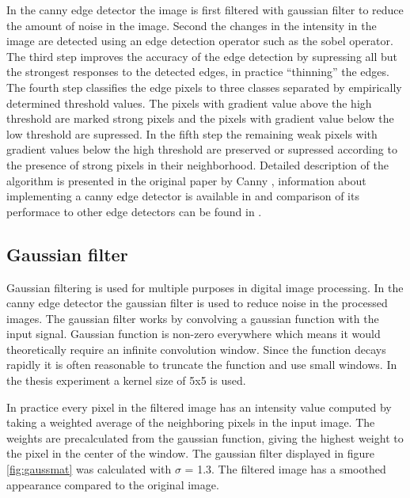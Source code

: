 In the canny edge detector the image is first filtered with gaussian filter to
reduce the amount of noise in the image. Second the changes in the intensity in
the image are detected using an edge detection operator such as the sobel
operator. The third step improves the accuracy of the edge detection by
supressing all but the strongest responses to the detected edges, in practice
``thinning'' the edges. The fourth step classifies the edge pixels to three
classes separated by empirically determined threshold values. The pixels with
gradient value above the high threshold are marked strong pixels and the pixels
with gradient value below the low threshold are supressed. In the fifth step the
remaining weak pixels with gradient values below the high threshold are
preserved or supressed according to the presence of strong pixels in their
neighborhood. Detailed description of the algorithm is presented in the original
paper by Canny \cite{canny1986computational}, information about implementing a
canny edge detector is available in \cite{gonzalez2008digital} and comparison of
its performace to other edge detectors can be found in \cite{maini2009study}.

\subsection{Gaussian filter}
\label{subsec:gauss}
Gaussian filtering is used for multiple purposes in digital image processing.
In the canny edge detector the gaussian filter is used to reduce noise in the
processed images. The gaussian filter works by convolving a gaussian function
with the input signal. Gaussian function is non-zero everywhere which means it
would theoretically require an infinite convolution window. Since the function
decays rapidly it is often reasonable to truncate the function and use small
windows. \cite{gonzalez2008digital} In the thesis experiment a kernel size of
5x5 is used.

In practice every pixel in the filtered image has an intensity value computed
by taking a weighted average of the neighboring pixels in the input image. The
weights are precalculated from the gaussian function, giving the highest weight
to the pixel in the center of the window. The gaussian filter displayed in
figure \ref{fig:gaussmat} was calculated with $\sigma$ = 1.3. The filtered
image has a smoothed appearance compared to the original image.

